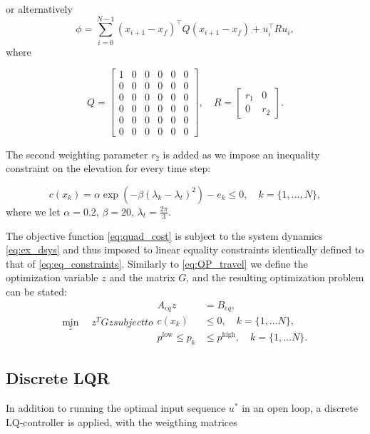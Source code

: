 or alternatively
\begin{equation}
	\label{eq:quad_cost}
	\phi = \sum_{i=0}^{N-1} (x_{i+1}-x_f)^\top Q(x_{i+1}-x_f) + u_i^\top R u_i,
\end{equation}
where

\begin{equation}
Q = \begin{bmatrix}1&0&0&0&0&0\\0&0&0&0&0&0\\0&0&0&0&0&0\\0&0&0&0&0&0\\0&0&0&0&0&0\\0&0&0&0&0&0\end{bmatrix}, \quad R = \begin{bmatrix}r_1&0\\0&r_2\end{bmatrix}.
\end{equation}

 The second weighting parameter $r_2$ is added as we impose an inequality constraint on the elevation for every time step:

\begin{equation}
	\label{eq:cons}
	c(x_k) = \alpha \exp{\left(-\beta\left(\lambda_k - \lambda_t\right)^2\right)} - e_k \le 0, \quad k = \{1, \dots , N\},
\end{equation}
where we let $\alpha = 0.2$, $\beta = 20$, $\lambda_t = \frac{2\pi}{3}$.

The objective function \eqref{eq:quad_cost} is subject to the system dynamics \eqref{eq:ex_dsys} and thus imposed to linear equality constraints identically defined to that of \eqref{eq:eq_constraints}. Similarly to \eqref{eq:QP_travel} we define the optimization variable $z$ and the matrix $G$, and the resulting optimization problem can be stated:
\begin{subequations}
\label{eq:NOP}
	\begin{equation}
		\min_z \quad z^T G z
	\end{equation}
subject to
\begin{align}
	A_{eq} z &= B_{eq}, \\
	c(x_k) &\le 0, \quad k = \{1, \dots N\},\\
	p^{\textrm{low}} \le p_k &\le p^{\textrm{high}}, \quad k = \{1, \dots N\}.
\end{align}
\end{subequations}


\subsection{Discrete LQR}
In addition to running the optimal input sequence $u^*$ in an open loop, a discrete LQ-controller is applied, with the weigthing matrices

